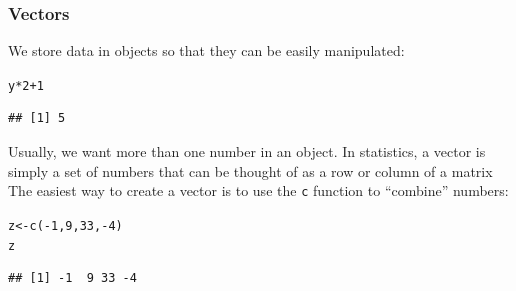 \documentclass[color=usenames,dvipsnames]{beamer}\usepackage[]{graphicx}\usepackage[]{color}
\makeatletter
\newcommand{\hlnum}[1]{\textcolor[rgb]{0.69,0.494,0}{#1}}%
\newcommand{\hlopt}[1]{\textcolor[rgb]{0,0,0}{#1}}%
\newcommand{\hlstd}[1]{\textcolor[rgb]{0,0,0}{#1}}%
\newcommand{\hlkwb}[1]{\textcolor[rgb]{0,0.341,0.682}{#1}}%
\newcommand{\hlkwd}[1]{\textcolor[rgb]{0.004,0.004,0.506}{#1}}%
\newenvironment{kframe}{%
 \def\at@end@of@kframe{}%
 \ifinner\ifhmode%
  \def\at@end@of@kframe{\end{minipage}}%
  \begin{minipage}{\columnwidth}%
 \fi\fi%
 \def\FrameCommand##1{\hskip\@totalleftmargin \hskip-\fboxsep
 \colorbox{shadecolor}{##1}\hskip-\fboxsep
     \hskip-\linewidth \hskip-\@totalleftmargin \hskip\columnwidth}%
 \MakeFramed {\advance\hsize-\width
   \@totalleftmargin\z@ \linewidth\hsize
   \@setminipage}}%
 {\par\unskip\endMakeFramed%
 \at@end@of@kframe}
\newenvironment{knitrout}{}{} %
\newcommand{\inr}[1]{\colorbox{inlinecolor}{\texttt{#1}}}
\makeatother
\begin{document}
\begin{frame}[fragile]
  \frametitle{Vectors}
We store data in objects so that they can be easily manipulated:
\begin{knitrout}\small
{}\color{fgcolor}\begin{kframe}
\begin{alltt}
\hlstd{y}\hlopt{*}\hlnum{2}\hlopt{+}\hlnum{1}
\end{alltt}
\begin{verbatim}
## [1] 5
\end{verbatim}
\end{kframe}
\end{knitrout}
\pause \vfill
Usually, we want more than one number in an object. In statistics, a
vector is simply a set of numbers that can be thought of as a row or
column of a matrix \\
\pause \vfill
The easiest way to create a vector is to use the \inr{c}
function to ``combine'' numbers:
\begin{knitrout}\small
{}\color{fgcolor}\begin{kframe}
\begin{alltt}
\hlstd{z} \hlkwb{<-} \hlkwd{c}\hlstd{(}\hlopt{-}\hlnum{1}\hlstd{,} \hlnum{9}\hlstd{,} \hlnum{33}\hlstd{,} \hlopt{-}\hlnum{4}\hlstd{)}
\hlstd{z}
\end{alltt}
\begin{verbatim}
## [1] -1  9 33 -4
\end{verbatim}
\end{kframe}
\end{knitrout}
\end{frame}




\end{document}
